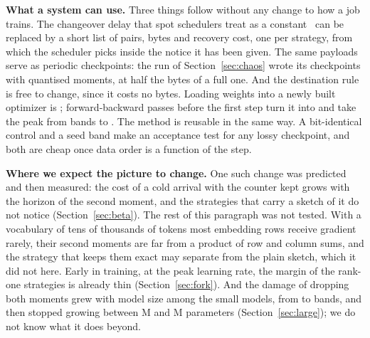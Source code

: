 \textbf{What a system can use.} Three things follow without any change to how a job trains. The changeover delay that
spot schedulers treat as a constant~\cite{wu2024cantbelate} can be replaced by a short list of pairs, bytes and
recovery cost, one per strategy, from which the scheduler picks inside the notice it has been given. The same payloads
serve as periodic checkpoints: the run of Section~\ref{sec:chaos} wrote its checkpoints with quantised moments, at half
the bytes of a full one. And the destination rule is free to change, since it costs no bytes. Loading weights into a
newly built optimizer is ; \warmPasses{} forward-backward passes before the first step turn it into
 and take the peak from \ratioWFresh{} bands to \ratioWWarmv. The method is reusable in the same way. A
bit-identical control and a seed band make an acceptance test for any lossy checkpoint, and both are cheap once data
order is a function of the step.

\textbf{Where we expect the picture to change.} One such change was predicted and then measured: the cost of a cold
arrival with the counter kept grows with the horizon of the second moment, and the strategies that carry a sketch of
it do not notice (Section~\ref{sec:beta}). The rest of this paragraph was not tested. With a vocabulary of tens of thousands of tokens most embedding rows receive
gradient rarely, their second moments are far from a product of row and column sums, and the strategy that keeps them
exact may separate from the plain sketch, which it did not here. Early in training, at the peak learning rate, the
margin of the rank-one strategies is already thin (Section~\ref{sec:fork}). And the damage of dropping both moments
grew with model size among the small models, from \sizeZeroXS{} to \sizeZeroM{} bands, and then stopped growing
between \paramsM{}M and \largeParams{}M parameters (Section~\ref{sec:large}); we do not know what it does beyond.
